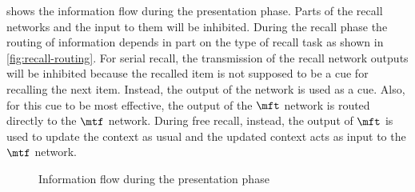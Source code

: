  shows the information flow during the presentation phase.
Parts of the recall networks and the input to them will be inhibited.
During the recall phase the routing of information depends in part on the type of recall task as shown in \cref{fig:recall-routing}.
For serial recall, the transmission of the recall network outputs will be inhibited because the recalled item is not supposed to be a cue for recalling the next item.
Instead, the output of the  network is used as a cue.
Also, for this cue to be most effective, the output of the $\mft$ network is routed directly to the $\mtf$ network.
During free recall, instead, the output of $\mft$ is used to update the context as usual and the updated context acts as input to the $\mtf$ network.
\begin{figure}
    \centering
    \caption{Information flow during the presentation phase}\label{fig:pres-routing}
\end{figure}
